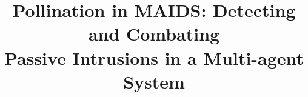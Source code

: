 \documentclass{acm_proc_article-sp}
\begin{document}
\title{Pollination in MAIDS: Detecting and Combating\\Passive Intrusions in a Multi-agent System}
%
%
%
%
%
\end{document}

